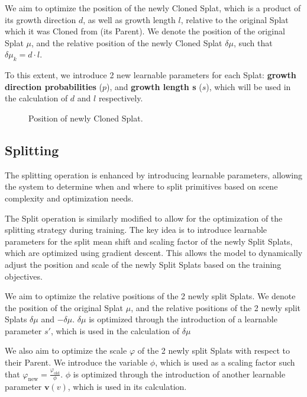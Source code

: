 \documentclass[11pt]{report}
\begin{document}
We aim to optimize the position of the newly Cloned Splat, which is a product of its growth direction $d$, as well as growth length $l$, relative to the original Splat which it was Cloned from (its Parent). We denote the position of the original Splat $\mu$, and the relative position of the newly Cloned Splat $\delta \mu$, such that $\delta \mu_k = d\cdot l$.

To this extent, we introduce 2 new learnable parameters for each Splat: \textbf{growth direction probabilities} ($p$), and \textbf{growth length s} ($s$), which will be used in the calculation of $d$ and $l$ respectively.

\begin{figure}[H]
    \centering
    
    \caption{Position of newly Cloned Splat.}
    \label{fig:clone}
\end{figure}

\subsection{Splitting}
The splitting operation is enhanced by introducing learnable parameters, allowing the system to determine when and where to split primitives based on scene complexity and optimization needs. 



The Split operation is similarly modified to allow for the optimization of the splitting strategy during training. The key idea is to introduce learnable parameters for the split mean shift and scaling factor of the newly Split Splats, which are optimized using gradient descent. This allows the model to dynamically adjust the position and scale of the newly Split Splats based on the training objectives. 

We aim to optimize the relative positions of the 2 newly split Splats. We denote the position of the original Splat $\mu$, and the relative positions of the 2 newly split Splats $\delta \mu$ and $- \delta \mu$. $\delta \mu$ is optimized through the introduction of a learnable parameter $s'$, which is used in the calculation of $\delta \mu$

We also aim to optimize the scale $\varphi$ of the 2 newly split Splats with respect to their Parent. We introduce the variable $\phi$, which is used as a scaling factor such that $\varphi_{\text{new}} = \frac{\varphi_{\text{old}}}{\phi}$. $\phi$ is optimized through the introduction of another learnable parameter $\mathbf{v}(v)$, which is used in its calculation.
\end{document}
